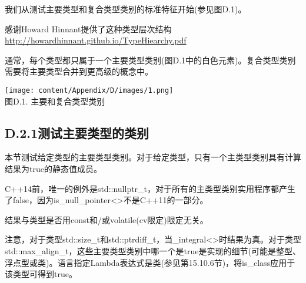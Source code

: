 
我们从测试主要类型和复合类型类别的标准特征开始(参见图D.1)。

\begin{notice}感谢Howard Hinnant提供了这种类型层次结构\url{http://howardhinnant.github.io/TypeHiearchy.pdf}
\end{notice}

通常，每个类型都只属于一个主要类型类别(图D.1中的白色元素)。复合类型类别需要将主要类型合并到更高级的概念中。

\begin{center}
\texttt{[image: content/Appendix/D/images/1.png]} \\
图D.1. 主要和复合类型类别
\end{center}

\subsection{D.2.1\hspace{0.2cm}测试主要类型的类别}

本节测试给定类型的主要类型类别。对于给定类型，只有一个主类型类别具有计算结果为true的静态值成员。

\begin{notice}C++14前，唯一的例外是std::nullptr\_t，对于所有的主类型类别实用程序都产生了false，因为is\_null\_pointer<>不是C++11的一部分。
\end{notice}

结果与类型是否用const和/或volatile(cv限定)限定无关。

注意，对于类型std::size\_t和std::ptrdiff\_t，当\_integral<>时结果为真。对于类型std::max\_align\_t，这些主要类型类别中哪一个是true是实现的细节(可能是整型、浮点型或类)。语言指定Lambda表达式是类(参见第15.10.6节)，将is\_class应用于该类型可得到true。

